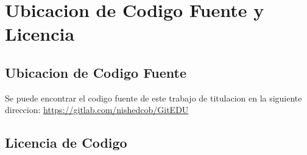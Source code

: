 
\chapter{Ubicacion de Codigo Fuente y Licencia}

\label{AnexoF} 

\section{Ubicacion de Codigo Fuente}
Se puede encontrar el codigo fuente de este trabajo de titulacion en la siguiente direccion: \url{https://gitlab.com/nishedcob/GitEDU}

\section{Licencia de Codigo}
